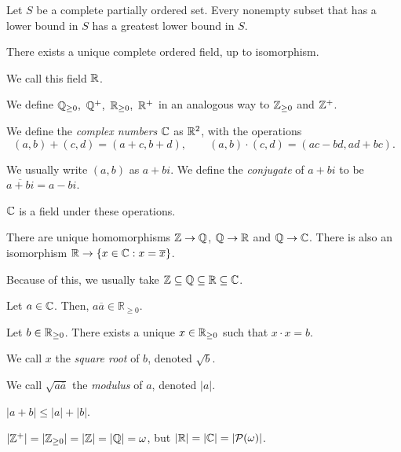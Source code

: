   \begin{prop}
    Let $S$ be a complete partially ordered set. Every nonempty subset that
    has a lower bound in $S$ has a greatest lower bound in $S$.
  \end{prop}
  \begin{thm}
    There exists a unique complete ordered field, up to isomorphism.
  \end{thm}
  \begin{defn}
    We call this field $\mathbb{R}$.
  \end{defn}
  \begin{defn}
    We define $\mathbb{Q}_{\ge 0},\ \mathbb{Q}^+,\ \mathbb{R}_{\ge 0},\ \mathbb{R}^+$ in an analogous way to
    $\mathbb{Z}_{\ge 0}$ and $\mathbb{Z}^+$.
  \end{defn}
  \begin{defn}
    We define the \emph{complex numbers} $\mathbb{C}$ as $\mathbb{R}^2$, with the operations
    \[(a,b)+(c,d)=(a+c,b+d),\qquad (a,b)\cdot(c,d)=(ac-bd,ad+bc).\]

    We usually write $(a,b)$ as $a+bi$. We define the \emph{conjugate} of $a+bi$
    to be $\overline{a+bi}=a-bi$.
  \end{defn}
  \begin{prop}
    $\mathbb{C}$ is a field under these operations.
  \end{prop}
  \begin{prop}
    There are unique homomorphisms $\mathbb{Z}\to\mathbb{Q}$, $\mathbb{Q}\to\mathbb{R}$ and $\mathbb{Q}\to\mathbb{C}$.
    There is also an isomorphism $\mathbb{R}\to\{x\in\mathbb{C}: x=\overline x\}$.
  \end{prop}
  \begin{rem}
    Because of this, we usually take $\mathbb{Z}\subseteq\mathbb{Q}\subseteq\mathbb{R}\subseteq\mathbb{C}$.
  \end{rem}
  \begin{prop}
    Let $a\in\mathbb{C}$. Then, $a\overline{a}\in\mathbb R_{\ge 0}$.
  \end{prop}
  \begin{prop}
    Let $b\in\mathbb{R}_{\ge 0}$. There exists a unique $x\in\mathbb{R}_{\ge 0}$ such that
    $x\cdot x=b$. 
  \end{prop}
  \begin{defn}
    We call $x$ the \emph{square root} of $b$, denoted $\sqrt b$.

    We call $\sqrt{a\overline a}$ the \emph{modulus} of $a$, denoted $|a|$.
  \end{defn}
  \begin{prop}
    $|a+b|\le|a|+|b|$.
  \end{prop}
  \begin{thm}
    $|\mathbb{Z}^+|=|\mathbb{Z}_{\ge 0}|=|\mathbb{Z}|=|\mathbb{Q}|=\omega$, but $|\mathbb{R}|=|\mathbb{C}|=|\mathcal
    P(\omega)|$.
  \end{thm}
